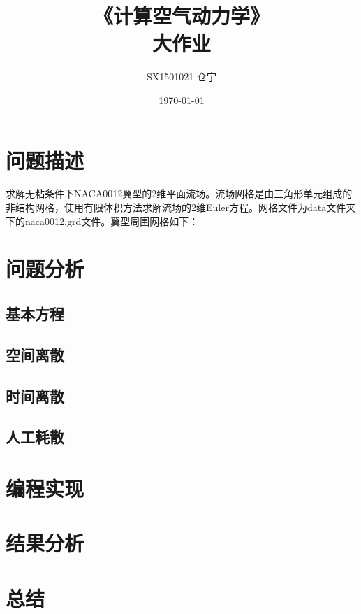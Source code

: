 \documentclass[UTF8]{ctexart}
\title{\heiti 《计算空气动力学》 \\ 大作业}
\author{SX1501021 仓宇}
\date{\today}
\begin{document}
\maketitle
\setcounter{page}{0}
\thispagestyle{empty}
\clearpage

\tableofcontents
\clearpage

\section{问题描述}
求解无粘条件下NACA0012翼型的2维平面流场。流场网格是由三角形单元组成的非结构网格，使用有限体积方法求解流场的2维Euler方程。网格文件为data文件夹下的naca0012.grd文件。翼型周围网格如下：

\section{问题分析}

\subsection{基本方程}

\subsection{空间离散}

\subsection{时间离散}

\subsection{人工耗散}

\section{编程实现}

\section{结果分析}

\section{总结}
\end{document}
